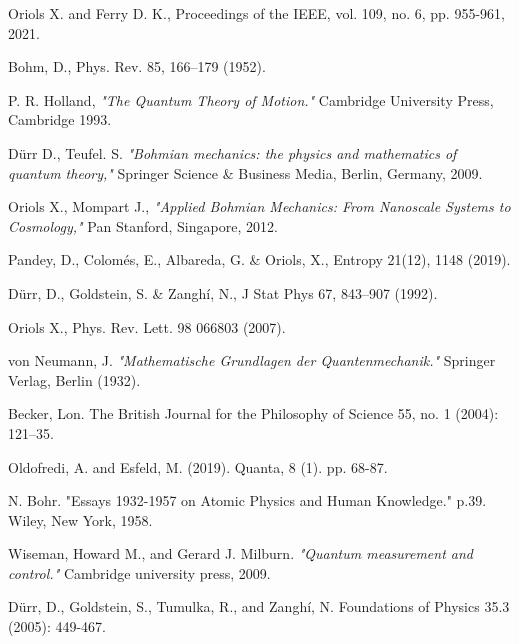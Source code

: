\documentclass[11pt, a4paper]{article} %
\begin{document}
\newpage
\twocolumn
\begin{thebibliography}{1}
{\footnotesize 

Oriols X. and Ferry D. K., Proceedings of the IEEE, vol. 109, no. 6, pp. 955-961, 2021.

Bohm, D., Phys. Rev. 85, 166–179 (1952).

P. R. Holland, {\em "The Quantum Theory of Motion."} Cambridge University Press, Cambridge 1993.

Dürr D., Teufel. S. {\em "Bohmian mechanics: the physics and mathematics of quantum theory,"} Springer Science \& Business Media, Berlin, Germany, 2009.

	Oriols X., Mompart J., {\em "Applied Bohmian Mechanics: From Nanoscale Systems to Cosmology,"} Pan Stanford, Singapore, 2012.
	
Pandey, D., Colomés, E., Albareda, G. \& Oriols, X., Entropy 21(12), 1148 (2019).

Dürr, D., Goldstein, S. \& Zanghí, N., J Stat Phys 67, 843–907 (1992).

Oriols X., Phys. Rev. Lett. 98 066803 (2007).


von Neumann, J. {\em "Mathematische Grundlagen der Quantenmechanik."} Springer Verlag, Berlin (1932).

Becker, Lon. The British Journal for the Philosophy of Science 55, no. 1 (2004): 121–35.

Oldofredi, A. and Esfeld, M. (2019). Quanta, 8 (1). pp. 68-87.

N. Bohr. {"Essays 1932-1957 on Atomic Physics and Human Knowledge."} p.39. Wiley, New York, 1958.

Wiseman, Howard M., and Gerard J. Milburn. {\em "Quantum measurement and control."} Cambridge university press, 2009.

Dürr, D., Goldstein, S., Tumulka, R., and Zanghí, N. Foundations of Physics 35.3 (2005): 449-467.

}
\end{thebibliography}
\end{document}

